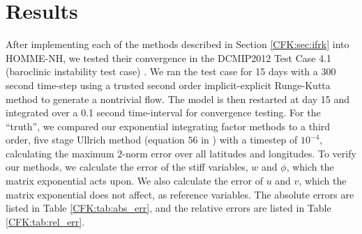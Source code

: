 \documentclass{csri19}
\begin{document}
\section{Results}\label{CFK:sec:results}
After implementing each of the methods described in Section 
\ref{CFK:sec:ifrk} into HOMME-NH, we tested their convergence in the 
DCMIP2012 Test Case 4.1 (baroclinic instability test case) \cite{dcmip2012}.  We ran the
test case for 15 days with a 300 second time-step using a trusted second order 
implicit-explicit Runge-Kutta method to generate a nontrivial flow. The model 
is then restarted at day 15 and integrated over a 0.1 second time-interval 
for convergence testing.  For the ``truth'', we compared our exponential integrating 
factor methods to a third order, five stage Ullrich method (equation $56$ in 
\cite{CFK:Guerra2016}) with a timestep of $10^{-4}$, calculating the 
maximum $2$-norm error over all latitudes and longitudes. To verify our 
methods, we calculate the error of the stiff variables, $w$ and $\phi$, 
which the matrix exponential acts upon. We also calculate the error of $u$ 
and $v$, which the matrix exponential does not affect, as reference 
variables. The absolute errors are listed in Table \ref{CFK:tab:abs_err}, 
and the relative errors are listed in Table \ref{CFK:tab:rel_err}.
\end{document}
